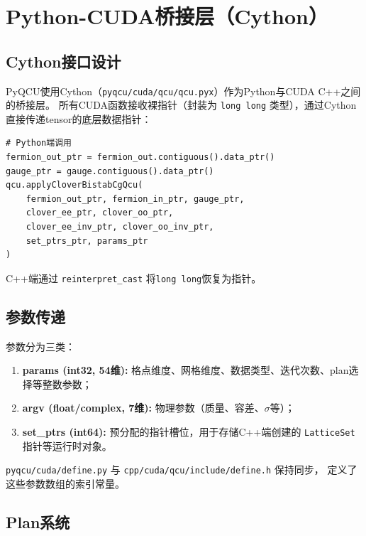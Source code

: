\documentclass[11pt,a4paper]{article}
\begin{document}
\section{Python-CUDA桥接层（Cython）}

\subsection{Cython接口设计}

PyQCU使用Cython（\texttt{pyqcu/cuda/qcu/qcu.pyx}）作为Python与CUDA C++之间的桥接层。
所有CUDA函数接收裸指针（封装为 \texttt{long long} 类型），通过Cython直接传递tensor的底层数据指针：

\begin{lstlisting}[style=pythonstyle]
# Python端调用
fermion_out_ptr = fermion_out.contiguous().data_ptr()
gauge_ptr = gauge.contiguous().data_ptr()
qcu.applyCloverBistabCgQcu(
    fermion_out_ptr, fermion_in_ptr, gauge_ptr,
    clover_ee_ptr, clover_oo_ptr,
    clover_ee_inv_ptr, clover_oo_inv_ptr,
    set_ptrs_ptr, params_ptr
)
\end{lstlisting}

C++端通过 \texttt{reinterpret\_cast} 将\texttt{long long}恢复为指针。

\subsection{参数传递}

参数分为三类：

\begin{enumerate}
    \item \textbf{params (int32, 54维):} 格点维度、网格维度、数据类型、迭代次数、plan选择等整数参数；
    \item \textbf{argv (float/complex, 7维):} 物理参数（质量、容差、$\sigma$等）；
    \item \textbf{set\_ptrs (int64):} 预分配的指针槽位，用于存储C++端创建的 \texttt{LatticeSet} 指针等运行时对象。
\end{enumerate}

\texttt{pyqcu/cuda/define.py} 与 \texttt{cpp/cuda/qcu/include/define.h} 保持同步，
定义了这些参数数组的索引常量。

\subsection{Plan系统}
\end{document}
